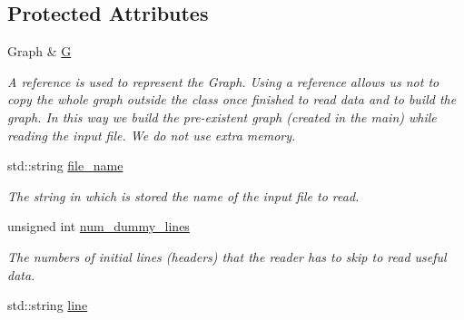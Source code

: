 \subsection*{Protected Attributes}
\begin{DoxyCompactItemize}
\item 
\hypertarget{classreader__base__class_a8453e0babb48c829551ed86a076990a0}{
Graph \& \hyperlink{classreader__base__class_a8453e0babb48c829551ed86a076990a0}{G}}
\label{classreader__base__class_a8453e0babb48c829551ed86a076990a0}

\begin{DoxyCompactList}\small\item\em A reference is used to represent the Graph.  Using a reference allows us not to copy the whole graph outside the class once finished to read data and to build the graph. In this way we build the pre-\/existent graph (created in the main) while reading the input file. We do not use extra memory. \item\end{DoxyCompactList}\item 
\hypertarget{classreader__base__class_ace1598042648e8af4275063a53bb2dc9}{
std::string \hyperlink{classreader__base__class_ace1598042648e8af4275063a53bb2dc9}{file\_\-name}}
\label{classreader__base__class_ace1598042648e8af4275063a53bb2dc9}

\begin{DoxyCompactList}\small\item\em The string in which is stored the name of the input file to read. \item\end{DoxyCompactList}\item 
\hypertarget{classreader__base__class_a68001946415ed68d9bd2b8e5fd01cbc3}{
unsigned int \hyperlink{classreader__base__class_a68001946415ed68d9bd2b8e5fd01cbc3}{num\_\-dummy\_\-lines}}
\label{classreader__base__class_a68001946415ed68d9bd2b8e5fd01cbc3}

\begin{DoxyCompactList}\small\item\em The numbers of initial lines (headers) that the reader has to skip to read useful data. \item\end{DoxyCompactList}\item 
\hypertarget{classreader__base__class_adf0049e509e246a1de1a9076255ab69a}{
std::string \hyperlink{classreader__base__class_adf0049e509e246a1de1a9076255ab69a}{line}}
\label{classreader__base__class_adf0049e509e246a1de1a9076255ab69a}


\end{DoxyCompactItemize}
